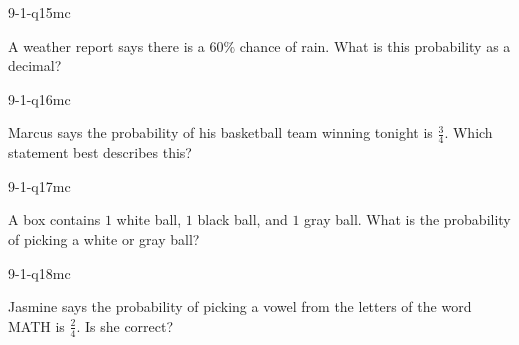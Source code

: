 \begin{practiceQuestion}{9-1-q15}{mc}
\begin{questionText}
A weather report says there is a $60\%$ chance of rain. What is this probability as a decimal?
\end{questionText}
\end{practiceQuestion}

\begin{practiceQuestion}{9-1-q16}{mc}
\begin{questionText}
Marcus says the probability of his basketball team winning tonight is $\frac{3}{4}$. Which statement best describes this?
\end{questionText}
\end{practiceQuestion}

\begin{practiceQuestion}{9-1-q17}{mc}
\begin{questionText}
A box contains $1$ white ball, $1$ black ball, and $1$ gray ball. What is the probability of picking a white or gray ball?
\end{questionText}
\end{practiceQuestion}

\begin{practiceQuestion}{9-1-q18}{mc}
\begin{questionText}
Jasmine says the probability of picking a vowel from the letters of the word MATH is $\frac{2}{4}$. Is she correct?
\end{questionText}
\end{practiceQuestion}

